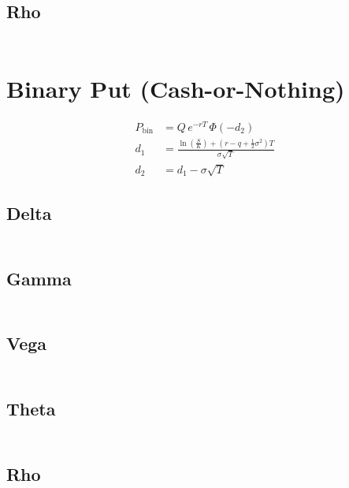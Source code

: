 \documentclass[12pt,a4paper]{article}
\begin{document}
\subsection{Rho}
\[
  \begin{aligned}
  \end{aligned}
\]

\section{Binary Put (Cash-or-Nothing)}

\[
  \begin{aligned}
    P_{\mathrm{bin}} & = Q \, e^{-rT} \,\Phi(-d_2)                                \\ d_1 & = \frac{\ln\!
    \left(\tfrac{S}{K}\right) + (r - q + \tfrac{1}{2}\sigma^2)T}{\sigma \sqrt{T}} \\
    d_2              & = d_1 - \sigma \sqrt{T}
  \end{aligned}
\]

\subsection{Delta}
\[
  \begin{aligned}
  \end{aligned}
\]

\subsection{Gamma}
\[
  \begin{aligned}
  \end{aligned}
\]

\subsection{Vega}
\[
  \begin{aligned}
  \end{aligned}
\]

\subsection{Theta}
\[
  \begin{aligned}
  \end{aligned}
\]

\subsection{Rho}
\[
  \begin{aligned}
  \end{aligned}
\]
\end{document}
